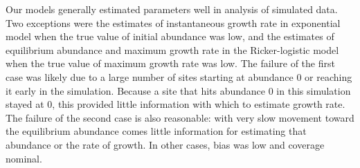 \documentclass[12pt]{article}
\begin{document}

Our models generally estimated parameters well in analysis of simulated data.
Two exceptions were the estimates of instantaneous growth rate in exponential model when the 
true value of initial abundance was low, and the estimates of equilibrium abundance and maximum
growth rate in the Ricker-logistic model when the true value of maximum growth rate was low.  
The failure of the first case was likely due to a large number of sites starting at abundance 0 or reaching it early in the simulation.  
Because a site that hits abundance 0 in this simulation stayed at 0, this provided little information with
which to estimate growth rate.  The failure of the second case is also reasonable: with very
slow movement toward the equilibrium abundance comes little information for estimating
that abundance or the rate of growth.  In other cases, bias was low and coverage nominal.
\end{document}

